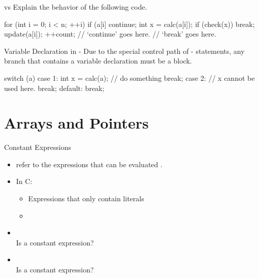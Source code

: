 \documentclass{beamer}
\begin{document}
\begin{frame}[fragile]{ vs }
    Explain the behavior of the following code.
    \begin{cpp}
for (int i = 0; i < n; ++i) {
  if (a[i] %
    continue;
  int x = calc(a[i]);
  if (check(x))
    break;
  update(a[i]);
  ++count;
  // `continue' goes here.
}
// `break' goes here.
    \end{cpp}
\end{frame}

\begin{frame}[fragile]{Variable Declaration in -}
    Due to the special control path of - statements, any  branch that contains a variable declaration must be a block.
    \begin{cpp}
switch (a) {
  case 1: {
    int x = calc(a);
    // do something
    break;
  }
  case 2:
    // x cannot be used here.
    break;
  default:
    break;
}
    \end{cpp}
\end{frame}

\section{Arrays and Pointers}

\begin{frame}[fragile]{Constant Expressions}
	\begin{itemize}
		\item {} refer to the expressions that can be evaluated .
		\item In C:
		\begin{itemize}
			\item Expressions that only contain literals
			\item {}
		\end{itemize}
		\pause
		\item {}\\
		Is  a constant expression?\\
		\pause
		\pause
		\item {}\\
		Is  a constant expression?\\
		\pause
	\end{itemize}
\end{frame}
\end{document}
